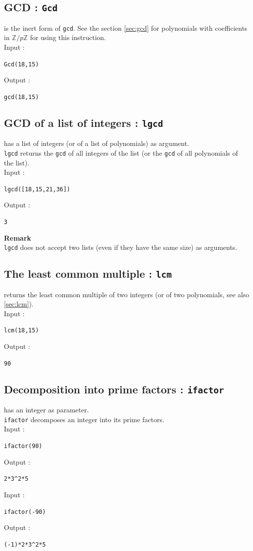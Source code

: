 \documentclass[a4paper,11pt]{book}
\newcommand{\Z}{{\mathbb{Z}}}
\begin{document}
\subsection{GCD : {\tt Gcd}}
 is the inert form of {\tt gcd}. See the section
\ref{sec:gcd} for polynomials with coefficients in $\Z/p\Z$ 
 for  using this instruction.\\
Input :
\begin{center}{\tt Gcd(18,15)}\end{center}
Output :
\begin{center}{\tt gcd(18,15)}\end{center}


\subsection{GCD of a list of integers : {\tt lgcd}}
 has  a list of integers (or of a list of polynomials)
as argument.\\ 
{\tt lgcd} returns the {\tt gcd} of all integers of the list (or
the {\tt gcd} of all polynomials of the list).\\
Input :
\begin{center}{\tt lgcd([18,15,21,36])}\end{center}
Output :
\begin{center}{\tt 3}\end{center} 
{\bf Remark}\\
{\tt lgcd} does not accept two lists (even if they have the same size)
as arguments.

\subsection{The least common multiple : {\tt lcm}}\label{sec:ilcm}
 returns the least common multiple of two integers (or of
two polynomials, see also \ref{sec:lcm}).\\
Input :
\begin{center}{\tt lcm(18,15) }\end{center}
Output :
\begin{center}{\tt 90}\end{center}

\subsection{Decomposition into prime factors  : {\tt ifactor}}
 has an integer as  parameter.\\
{\tt ifactor} decomposes an integer into its prime factors.\\
Input :
\begin{center}{\tt ifactor(90) }\end{center}
Output :
\begin{center}{\tt 2*3\verb|^|2*5}\end{center}
Input :
\begin{center}{\tt ifactor(-90) }\end{center}
Output :
\begin{center}{\tt (-1)*2*3\verb|^|2*5}\end{center}
\end{document}
